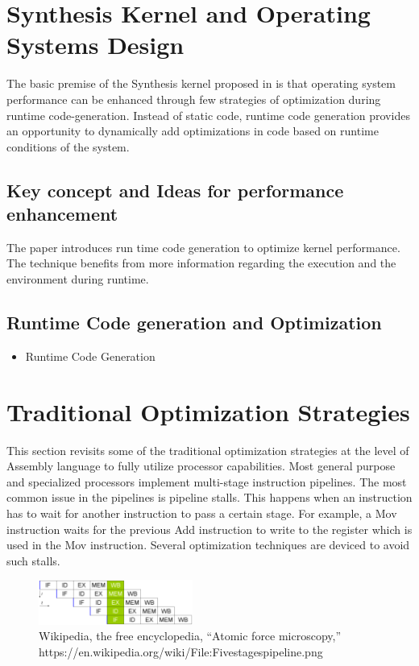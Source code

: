 \documentclass[sigconf]{acmart}
\begin{document}
\section{Synthesis Kernel and Operating Systems Design}
The basic premise of the Synthesis kernel proposed in \cite{synthesis92} is that operating system performance can be enhanced through few strategies of optimization during runtime code-generation. Instead of static code, runtime code generation provides an opportunity to dynamically add optimizations in code based on runtime conditions of the system.

\subsection{Key concept and Ideas for performance enhancement}

The paper \cite{synthesis92} introduces run time code generation to optimize kernel performance. The technique benefits from more information regarding the execution and the environment during runtime. 

\subsection{Runtime Code generation and Optimization}
\begin{itemize}
\item{Runtime Code Generation}
\end{itemize}

\section{Traditional Optimization Strategies}
This section revisits some of the traditional optimization strategies at the level of Assembly language to fully utilize processor capabilities. Most general purpose and specialized processors implement multi-stage instruction pipelines. The most common issue in the pipelines is pipeline stalls. This happens when an instruction has to wait for another instruction to pass a certain stage. For example, a Mov instruction waits for the previous Add instruction to write to the register which is used in the Mov instruction. Several optimization techniques are deviced to avoid such stalls. 

\begin{figure}[h]
  \includegraphics[width=0.45\textwidth]{images/pipelines}
  \caption{Wikipedia, the free encyclopedia, “Atomic force microscopy,” https://en.wikipedia.org/wiki/File:Fivestagespipeline.png}
\end{figure}
\end{document}
